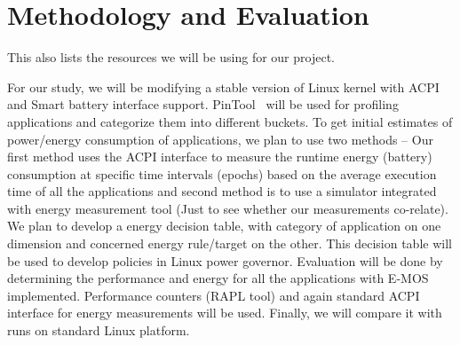 \section{Methodology and Evaluation}\label{sec:meth}
	This also lists the resources we will be using for our project.

For our study, we will be modifying a stable version of Linux kernel with ACPI and Smart battery interface support. PinTool~\cite{pin} will be used for profiling applications and categorize them into different buckets. To get initial estimates of power/energy consumption of applications, we plan to use two methods -- Our first method uses the ACPI interface to measure the runtime energy (battery) consumption at specific time intervals (epochs) based on the average execution time of all the applications and second method is to use a simulator integrated with energy measurement tool (Just to see whether our measurements co-relate). 
We plan to develop a energy decision table, with category of application on one dimension and concerned energy rule/target on the other. This decision table will be used to develop policies in Linux power governor.  
Evaluation will be done by determining the performance and energy for all the applications with E-MOS implemented. Performance counters (RAPL tool) and again standard ACPI interface for energy measurements will be used.
Finally, we will compare it with runs on standard Linux platform. 



